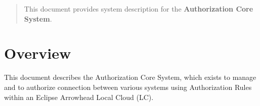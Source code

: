 \documentclass[a4paper]{arrowhead}
\begin{document}
\ArrowheadDate{\today}
\ArrowheadSetup

\begin{center}
  \vspace*{1cm}
  \huge{\arrowtitle}

  \vspace*{0.2cm}
  \LARGE{\arrowtype}
  \vspace*{1cm}

  \vspace*{\fill}


  \vspace*{1cm}
  \vspace*{\fill}

  \begin{abstract}
    This document provides system description for the \textbf{Authorization Core System}.
  \end{abstract}

  \vspace*{1cm}

 \end{center}

\newpage

\tableofcontents
\newpage

\section{Overview}
\label{sec:overview}
\color{black}
This document describes the Authorization Core System, which exists to manage and to authorize
connection between various systems using Authorization Rules within an Eclipse Arrowhead Local Cloud (LC). 
\end{document}
